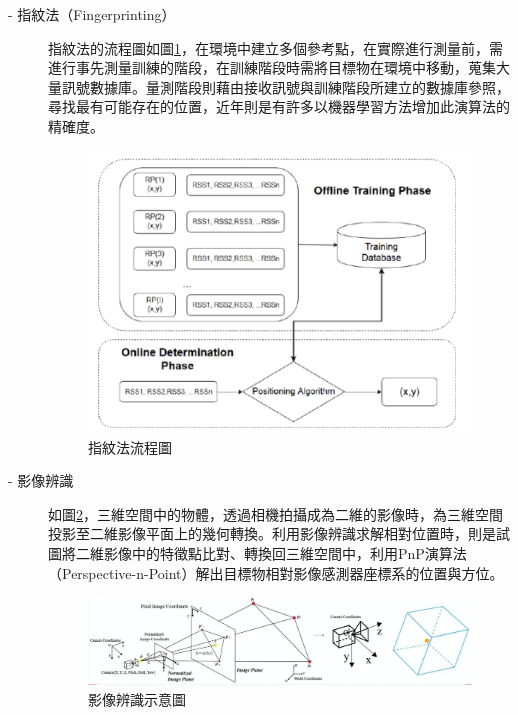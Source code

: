 \begin{description}
        \item[- 指紋法（Fingerprinting）] \hfill 
        
        \qquad
        指紋法的流程圖如圖\ref{pic:fingerprinting}，在環境中建立多個參考點，在實際進行測量前，需進行事先測量訓練的階段，在訓練階段時需將目標物在環境中移動，蒐集大量訊號數據庫。量測階段則藉由接收訊號與訓練階段所建立的數據庫參照，尋找最有可能存在的位置\cite{survey_light2020}，近年則是有許多以機器學習方法增加此演算法的精確度。
        \begin{figure}[htpb]
            \centering
            \includegraphics[width=13cm]{ch2pic/fingerprinting.png}
            \caption{指紋法流程圖\cite{pic:fingerprinting}}
            \label{pic:fingerprinting}
        \end{figure}
        
        \item[- 影像辨識]\hfill 
        
        \qquad
    如圖\ref{pic:image_processing}，三維空間中的物體，透過相機拍攝成為二維的影像時，為三維空間投影至二維影像平面上的幾何轉換。利用影像辨識求解相對位置時，則是試圖將二維影像中的特徵點比對、轉換回三維空間中，利用PnP演算法（Perspective-n-Point）解出目標物相對影像感測器座標系的位置與方位\cite{pic:image_processing}。
        
        \begin{figure}[htpb]
            \centering
            \includegraphics[width=15cm]{ch2pic/image_processing.png}
            \caption{影像辨識示意圖\cite{pic:image_processing}}
            \label{pic:image_processing}
        \end{figure}
        

\end{description}
